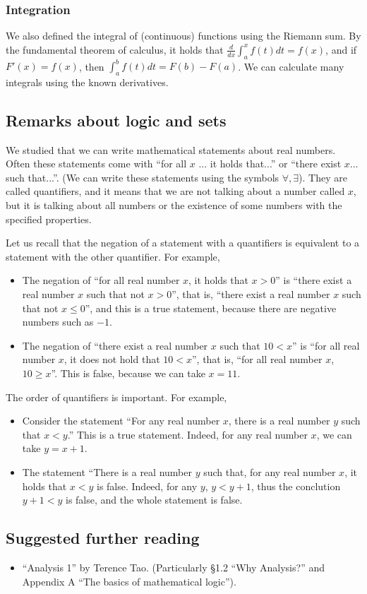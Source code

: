 \subsubsection*{Integration}

We also defined the integral of (continuous) functions using the Riemann sum.
By the fundamental theorem of calculus, it holds that 
$\frac{d}{dx}\int_a^x f(t)dt = f(x)$, and if $F'(x) = f(x)$, then $\int_a^b f(t)dt = F(b)-F(a)$.
We can calculate many integrals using the known derivatives.

\subsection*{Remarks about logic and sets}
We studied that we can write mathematical statements about real numbers.
Often these statements come with ``for all $x$ ... it holds that...'' or ``there exist $x$... such that...''.
(We can write these statements using the symbols $\forall, \exists$).
They are called quantifiers, and it means that we are not talking about a number called $x$, but it is talking about
all numbers or the existence of some numbers with the specified properties.

Let us recall that the negation of a statement with a quantifiers is equivalent to a statement with the other quantifier.
For example,
\begin{itemize}
 \item The negation of ``for all real number $x$, it holds that $x > 0$''
 is ``there exist a real number $x$ such that not $x > 0$'',
 that is, ``there exist a real number $x$ such that not $x \le 0$'',
 and this is a true statement, because there are negative numbers such as $-1$.
 \item The negation of ``there exist a real number $x$ such that $10 < x$''
 is ``for all real number $x$, it does not hold that $10 < x$'',
 that is,  ``for all real number $x$, $10 \ge x$''. This is false, because we can take $x=11$.
\end{itemize}


The order of quantifiers is important. For example,
\begin{itemize}
 \item Consider the statement ``For any real number $x$, there is a real number $y$ such that $x < y$.''
 This is a true statement. Indeed, for any real number $x$, we can take $y = x + 1$.
 \item The statement ``There is a real number $y$ such that, for any real number $x$, it holds that $x < y$ is false.
 Indeed, for any $y$, $y < y+1$, thus the conclution $y+1 < y$ is false, and the whole statement is false.
\end{itemize}




\subsection*{Suggested further reading}

\begin{itemize}
  \item ``Analysis 1'' by Terence Tao.
        (Particularly \S 1.2 ``Why Analysis?'' and Appendix A ``The basics of mathematical logic'').
\end{itemize}

\bookletend%
